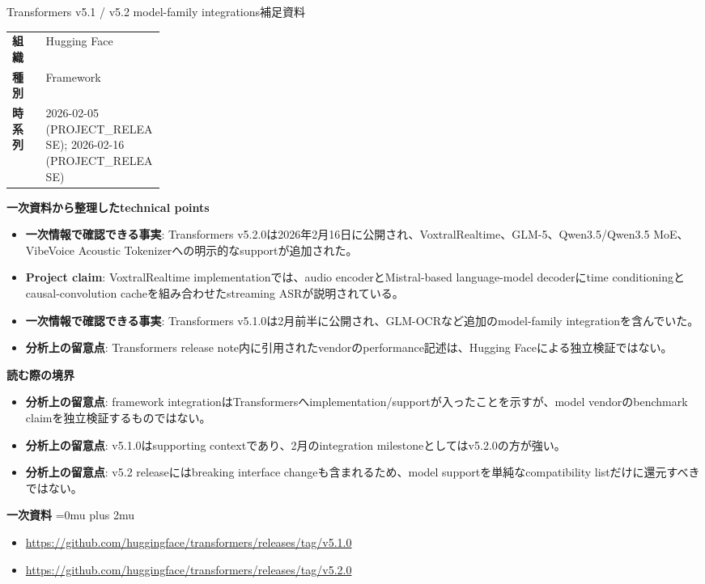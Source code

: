 \begin{technicalnote}{Transformers v5.1 / v5.2 model-family integrations}{補足資料}
\begingroup
\begin{tabularx}{\linewidth}{@{}>{\bfseries}p{0.22\linewidth}X@{}}
組織 & Hugging Face \\
種別 & Framework \\
時系列 & 2026-02-05 (PROJECT\_RELEASE); 2026-02-16 (PROJECT\_RELEASE) \\
\end{tabularx}
\smallskip
{\bfseries 一次資料から整理したtechnical points}
\begin{itemize}[leftmargin=1.5em,itemsep=0.35em]
\item \textbf{一次情報で確認できる事実}: Transformers v5.2.0は2026年2月16日に公開され、VoxtralRealtime、GLM-5、Qwen3.5/Qwen3.5 MoE、VibeVoice Acoustic Tokenizerへの明示的なsupportが追加された。
\item \textbf{Project claim}: VoxtralRealtime implementationでは、audio encoderとMistral-based language-model decoderにtime conditioningとcausal-convolution cacheを組み合わせたstreaming ASRが説明されている。
\item \textbf{一次情報で確認できる事実}: Transformers v5.1.0は2月前半に公開され、GLM-OCRなど追加のmodel-family integrationを含んでいた。
\item \textbf{分析上の留意点}: Transformers release note内に引用されたvendorのperformance記述は、Hugging Faceによる独立検証ではない。
\end{itemize}
\begin{minipage}{\linewidth}
{\bfseries 読む際の境界}
\begin{itemize}[leftmargin=1.5em,itemsep=0.35em]
\item \textbf{分析上の留意点}: framework integrationはTransformersへimplementation/supportが入ったことを示すが、model vendorのbenchmark claimを独立検証するものではない。
\item \textbf{分析上の留意点}: v5.1.0はsupporting contextであり、2月のintegration milestoneとしてはv5.2.0の方が強い。
\item \textbf{分析上の留意点}: v5.2 releaseにはbreaking interface changeも含まれるため、model supportを単純なcompatibility listだけに還元すべきではない。
\end{itemize}
\begin{samepage}
{\bfseries 一次資料}
\begingroup\sloppy
\Urlmuskip=0mu plus 2mu\relax
\begin{itemize}[leftmargin=1.5em,itemsep=0.25em]
\item {\scriptsize\url{https://github.com/huggingface/transformers/releases/tag/v5.1.0}}
\item {\scriptsize\url{https://github.com/huggingface/transformers/releases/tag/v5.2.0}}
\end{itemize}
\endgroup
\end{samepage}
\end{minipage}
\endgroup
\end{technicalnote}
\medskip
